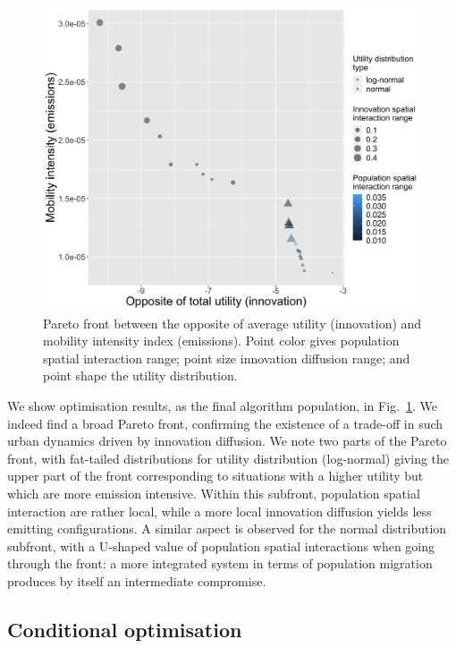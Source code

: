 \documentclass[final,5p,times,twocolumn,authoryear]{elsarticle}
\begin{document}
\begin{figure}
	\centering
	\includegraphics[width=\linewidth]{figures/pareto-oppAverageUtility-averageGravityFlow_color-gravityDecay_size-innovationDecay_shape-utilityDistribution.png}
	\caption{Pareto front between the opposite of average utility (innovation) and mobility intensity index (emissions). Point color gives population spatial interaction range; point size innovation diffusion range; and point shape the utility distribution.\label{fig:fig1}}
\end{figure}

We show optimisation results, as the final algorithm population, in Fig.~\ref{fig:fig1}. We indeed find a broad Pareto front, confirming the existence of a trade-off in such urban dynamics driven by innovation diffusion. We note two parts of the Pareto front, with fat-tailed distributions for utility distribution (log-normal) giving the upper part of the front corresponding to situations with a higher utility but which are more emission intensive. Within this subfront, population spatial interaction are rather local, while a more local innovation diffusion yields less emitting configurations. A similar aspect is observed for the normal distribution subfront, with a U-shaped value of population spatial interactions when going through the front: a more integrated system in terms of population migration produces by itself an intermediate compromise.






\subsection{Conditional optimisation}
\end{document}
